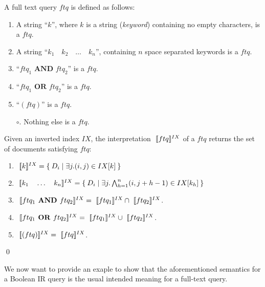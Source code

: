 \begin{definition}
A full text query $ftq$ is defined as follows:
\begin{enumerate}
	\item A string ``$k$'', where $k$ is a string (\textit{keyword})  containing no empty characters, is a $ftq$.
	\item A string ``$k_1\quad k_2\quad\dots\quad k_n$'', containing $n$ space separated keywords  is a $ftq$.
	\item ``$ftq_1 \textbf{ AND } ftq_2$'' is a $ftq$.
	\item ``$ftq_1 \textbf{ OR } ftq_2$'' is a $ftq$.
	\item ``$(ftq)$'' is a $ftq$.
	\item[$\circ$.] Nothing else is a $ftq$.
\end{enumerate} 
Given an inverted index $IX$, the interpretation $\sem[IX]{ftq}$ of a $ftq$ returns the set of documents satisfying  $ftq$:
\begin{enumerate}
	\item $\sem[IX]{k} = \Set{D_i|\exists j. (i,j)\in IX[k]}$ 
	\item $\sem[IX]{k_1\quad\dots\quad k_n} = \Set{D_i|\exists j. \bigwedge_{h=1}^{n}  (i,j+h-1)\in IX[k_h]}$ 
	\item $\sem[IX]{ftq_1 \textbf{ AND } ftq_2}=\sem[IX]{ftq_1}\cap \sem[IX]{ftq_2}$.
	\item $\sem[IX]{ftq_1 \textbf{ OR } ftq_2}=\sem[IX]{ftq_1}\cup \sem[IX]{ftq_2}$.
	\item $\sem[IX]{(ftq)}=\sem[IX]{ftq}$.
\end{enumerate} 
\qed
\end{definition}

We now want to provide an exaple to show that the aforementioned semantics for a Boolean IR query is the usual intended meaning for a full-text query.

